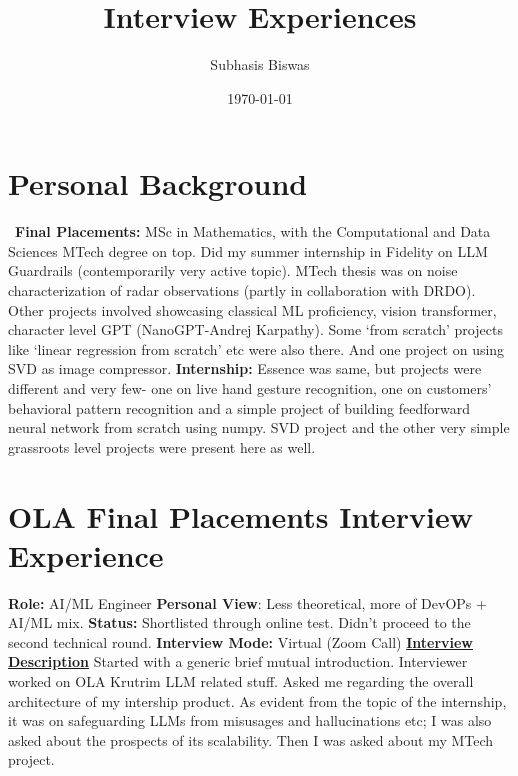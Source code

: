 \documentclass[12pt]{article}
\title{Interview Experiences}
\author{Subhasis Biswas}
\date{\today} %
\begin{document}
\maketitle
\tableofcontents

\section{Personal Background}
\
\textbf{Final Placements: }MSc in Mathematics, with the Computational and Data Sciences MTech degree on top. 
Did my summer internship in Fidelity on LLM Guardrails (contemporarily very active topic). 
MTech thesis was on noise characterization of radar observations (partly in collaboration with DRDO).
Other projects involved showcasing classical ML proficiency, vision transformer, character level GPT (NanoGPT-Andrej Karpathy). Some `from scratch' projects like `linear regression from scratch' etc were also there. And one project on using SVD as image compressor.
\newline
\newline
\textbf{Internship:} Essence was same, but projects were different and very few- one on live hand gesture recognition, one on customers' behavioral pattern recognition and a simple project of building feedforward neural network from scratch using numpy. SVD project and the other very simple grassroots level projects were present here as well.

\section{OLA Final Placements Interview Experience}


\textbf{Role:} AI/ML Engineer
\newline
\textbf{Personal View}: Less theoretical, more of DevOPs + AI/ML mix.
\newline
\textbf{Status:} Shortlisted through online test. Didn't proceed to the second technical round.
\newline
\textbf{Interview Mode:} Virtual (Zoom Call)
\vspace{10pt}
\newline
\underline{\textbf{Interview Description}}
\newline
Started with a generic brief mutual introduction. Interviewer worked on OLA Krutrim LLM related stuff. Asked me regarding the overall architecture of my intership product. As evident from the topic of the internship, it was on safeguarding LLMs from misusages and hallucinations etc; I was also asked about the prospects of its scalability. Then I was asked about my MTech project.
\end{document}
